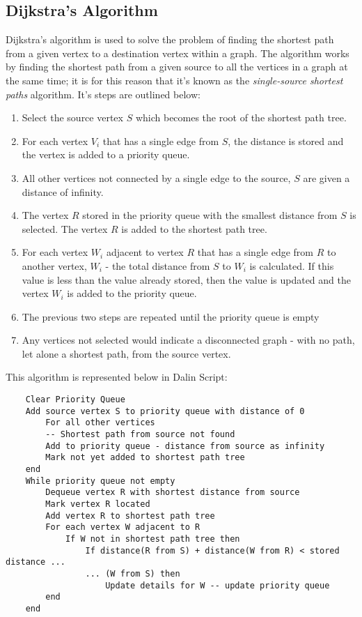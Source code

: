 \subsection{Dijkstra's Algorithm}
Dijkstra's algorithm is used to solve the problem of finding the shortest path from a given vertex to a destination vertex within a graph. The algorithm works by finding the shortest path from a given source to all the vertices in a graph at the same time; it is for this reason that it's known as the \textit{single-source shortest paths} algorithm. It's steps are outlined below:
\begin{enumerate}
    \item Select the source vertex $S$ which becomes the root of the shortest path tree.
    \item For each vertex $V_i$ that has a single edge from $S$, the distance is stored and the vertex is added to a priority queue. 
    \item All other vertices not connected by a single edge to the source, $S$ are given a distance of infinity.
    \item The vertex $R$ stored in the priority queue with the smallest distance from $S$ is selected. The vertex $R$ is added to the shortest path tree.
    \item For each vertex $W_i$ adjacent to vertex $R$ that has a single edge from $R$ to another vertex, $W_i$ - the total distance from $S$ to $W_i$ is calculated. If this value is less than the value already stored, then the value is updated and the vertex $W_i$ is added to the priority queue.
    \item The previous two steps are repeated until the priority queue is empty
    \item Any vertices not selected would indicate a disconnected graph - with no path, let alone a shortest path, from the source vertex.
\end{enumerate}
This algorithm is represented below in Dalin Script:
\begin{verbatim}
    Clear Priority Queue
    Add source vertex S to priority queue with distance of 0
        For all other vertices
        -- Shortest path from source not found
        Add to priority queue - distance from source as infinity
        Mark not yet added to shortest path tree
    end
    While priority queue not empty
        Dequeue vertex R with shortest distance from source
        Mark vertex R located
        Add vertex R to shortest path tree
        For each vertex W adjacent to R
            If W not in shortest path tree then
                If distance(R from S) + distance(W from R) < stored distance ...
                ... (W from S) then
                    Update details for W -- update priority queue
        end
    end
\end{verbatim}

